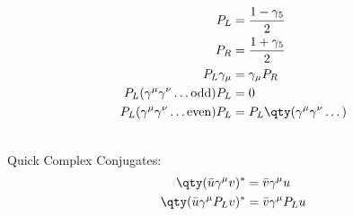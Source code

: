 \begin{minipage}{0.45\textwidth}
	\begin{align*}
		P_L&=\frac{1-\gamma_5}{2}
		\\
		P_R&=\frac{1+\gamma_5}{2}
		\\
		P_L\gamma_\mu&=\gamma_\mu P_R
		\\
		P_L(\gamma^\mu\gamma^\nu\dotsc\text{odd})P_L&=0
		\\
		P_L(\gamma^\mu\gamma^\nu\dotsc\text{even})P_L&=P_L\qty(\gamma^\mu\gamma^\nu\dotsc)
	\end{align*}
\end{minipage}
\\[0.25 cm]
Quick Complex Conjugates:
\\
\begin{align*}
	\qty(\bar{u}\gamma^\mu v)^*&=\bar{v}\gamma^\mu u 
	\\
	\qty(\bar{u}\gamma^\mu P_Lv)^*&=\bar{v}\gamma^\mu P_L u
\end{align*}
\newpage
\begin{comment}
	
	\begin{figure}
		\begin{tikzpicture}
			\feynmandiagram[horizontal=b to d]{
				{a[label=$p_a$],b[label=$p_b$]} -- [fermion] v1 [blob, label=$\vdots$]--[fermion] {c[label=$k_1$],d[label=$k_n$]},
				a -- [opacity=0] b,
				c -- [opacity=0] d,
				};
			\end{tikzpicture}
		\end{figure}
		Mandelstam Variables:
		\tikzfeynmanset{every momentum/arrow shorten/.append style={0.7}}
		\begin{align*}
			\feynmandiagram[baseline=(v1.base), horizontal=v1 to v2]{
				a -- [fermion, momentum'=$p_a$] v1 -- [fermion, reversed momentum=$p_b$] b,
				v1 -- [photon, edge label=$p_a+p_b$] v2 -- [fermion, momentum'=$k_1$] c,
				d -- [fermion, momentum=$k_2$] v2,
				};&& 
				s&=(p_a+p_b)^2c^2=(k_1+k_2)^2c^2
				\\[0.25cm]
				\feynmandiagram[baseline=(v1.base), vertical=v1 to v2]{
					a -- [fermion, momentum'=$p_b$] v1 -- [fermion, momentum=$k_1$] b,
					v1 -- [photon, edge label=$p_a-k_1$] v2 -- [fermion, momentum'=$k_1$] c,
					d -- [fermion, momentum=$p_b$] v2,
					};&& 
					t&=(p_a+p_b)^2c^2=(k_1+k_2)^2c^2
				\end{align*}
			\end{comment}